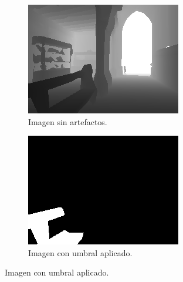 \begin{figure}
    \begin{subfigure}[b]{.475\textwidth}
    \centering
    \includegraphics[width=\textwidth]{imagenes/cap5/filled.png}
    \caption{Imagen sin artefactos.}
    \end{subfigure}
    \begin{subfigure}[b]{.475\textwidth}
    \centering
    \includegraphics[width=\textwidth]{imagenes/cap5/thresholded.png}
    \caption{Imagen con umbral aplicado.}
    \end{subfigure}


\end{figure}
